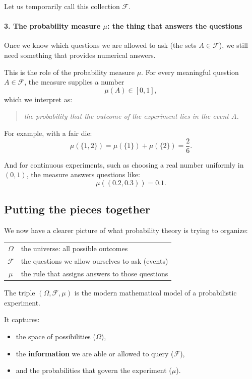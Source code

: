 \documentclass[11pt]{article}
\theoremstyle{remark}
\begin{document}
Let us temporarily call this collection \(\mathcal{F}\).

\medskip

\paragraph{3. The probability measure \(\mu\): the thing that answers the questions}

Once we know which questions we are allowed to ask (the sets \(A\in\mathcal{F}\)),
we still need something that provides numerical answers.

This is the role of the probability measure \(\mu\).
For every meaningful question \(A \in \mathcal{F}\), the measure supplies a number
\[
\mu(A) \in [0,1],
\]
which we interpret as:
\begin{quote}
\emph{the probability that the outcome of the experiment lies in the event \(A\).}
\end{quote}

For example, with a fair die:
\[
\mu(\{1,2\}) = \mu(\{1\})+\mu(\{2\})=\frac{2}{6}.
\]

And for continuous experiments, such as choosing a real number uniformly in \((0,1)\),
the measure answers questions like:
\[
\mu((0.2,0.3))=0.1.
\]

\subsection{Putting the pieces together}

We now have a clearer picture of what probability theory is trying to organize:

\begin{center}
\begin{tabular}{cl}
\(\Omega\) & the universe: all possible outcomes \\[4pt]
\(\mathcal{F}\) & the questions we allow ourselves to ask (events) \\[4pt]
\(\mu\) & the rule that assigns answers to those questions
\end{tabular}
\end{center}

The triple \((\Omega,\mathcal{F},\mu)\) is the modern mathematical model of a probabilistic experiment.

It captures:
\begin{itemize}
\item the space of possibilities (\(\Omega\)),
\item the \textbf{information} we are able or allowed to query (\(\mathcal{F}\)),
\item and the probabilities that govern the experiment (\(\mu\)).
\end{itemize}
\end{document}
